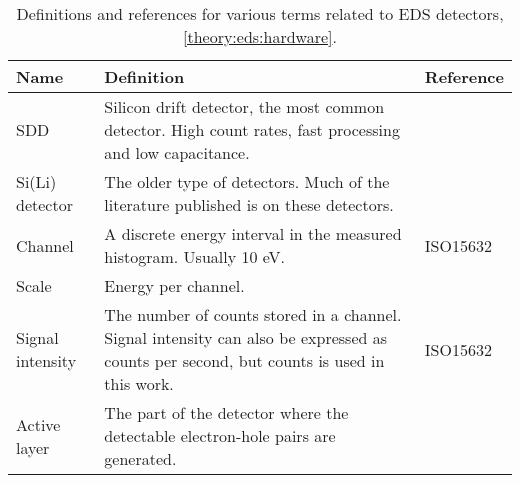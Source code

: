 \begin{table}[pht]
    \begin{center}
        \caption{Definitions and references for various terms related to EDS detectors, \cref{theory:eds:hardware}.}
        \renewcommand*{\arraystretch}{1.4}
        \label{tab:eds:hardware}
        \begin{tabular}{lp{10cm}l}

            \hline
            \textbf{Name}          & \textbf{Definition}                                                                                                                                                                                                    & \textbf{Reference} \\
            \hline
            SDD                    & Silicon drift detector, the most common detector. High count rates, fast processing and low capacitance.                                                                                                               &                    \\
            Si(Li) detector        & The older type of detectors. Much of the literature published is on these detectors.                                                                                                                                   &                    \\
            Channel                & A discrete energy interval in the measured histogram. Usually 10 eV.                                                                                                                                                   & ISO15632           \\
            Scale                  & Energy per channel.                                                                                                                                                                                                    &                    \\
            Signal intensity       & The number of counts stored in a channel. Signal intensity can also be expressed as counts per second, but counts is used in this work.                                                                                & ISO15632           \\
            Active layer           & The part of the detector where the detectable electron-hole pairs are generated.                                                                                                                                       &                    \\

\end{tabular}
\end{center}
\end{table}
